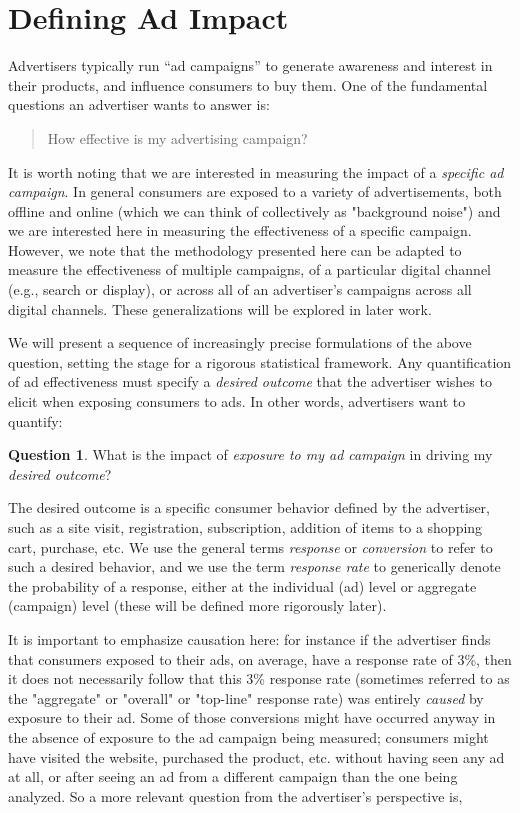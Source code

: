\documentclass[11pt,a4paper]{article}
\theoremstyle{definition}
\theoremstyle{remark}
\theoremstyle{definition}
\theoremstyle{definition}
\theoremstyle{definition}
\newtheorem{question}{Question}[section]
\theoremstyle{definition}
\theoremstyle{definition}
\theoremstyle{definition}
\begin{document}
\section{Defining Ad Impact} \label{sec-define}

Advertisers typically run “ad campaigns” to generate awareness and interest in their products, and influence consumers to buy them. One of the fundamental questions an advertiser wants to answer is: 
\begin{quote}
How effective is my advertising campaign?	
\end{quote}


It is worth noting that we are interested in measuring the impact of a \textit{specific ad campaign}. In general consumers are exposed to a variety of advertisements, both offline and online (which we can think of collectively as "background noise") and we are interested here in measuring the effectiveness of a specific campaign. However, we note that the methodology presented here can be adapted to measure the effectiveness of multiple campaigns, of a particular digital channel (e.g., search or display), or across all of an advertiser’s campaigns across all digital channels. These generalizations will be explored in later work. 

We will present a sequence of increasingly precise formulations of the above question, setting the stage for a rigorous statistical framework. 
Any quantification of ad effectiveness must specify a {\em desired outcome} that the advertiser wishes to elicit when exposing consumers to ads. In other words, advertisers want to quantify:

\begin{question}\small
What is the impact of {\em exposure to my ad campaign} in driving my {\em desired outcome}? 	
\end{question}


 
The desired outcome is a specific consumer behavior defined by the advertiser, such as a site visit, registration, subscription, addition of items to a shopping cart, purchase, etc. We use the general terms {\em response} or {\em conversion} to refer to such a desired behavior, and we use the term  {\em response rate} to generically denote the probability of a response, either at the individual (ad) level or aggregate (campaign) level (these will be defined more rigorously later).

It is important to emphasize causation here: for instance if the advertiser finds that consumers exposed to their ads, on average, have a response rate of 3\%, then it does not necessarily follow that this 3\% response rate (sometimes referred to as the "aggregate" or "overall" or "top-line" response rate) was entirely {\em caused} by exposure to their ad. Some of those conversions might have occurred anyway in the absence of exposure to the ad campaign being measured; consumers might have visited the website, purchased the product, etc. without having seen any ad at all, or after seeing an ad from a different campaign than the one being analyzed. So a more relevant question from the advertiser's perspective is, 
\end{document}

